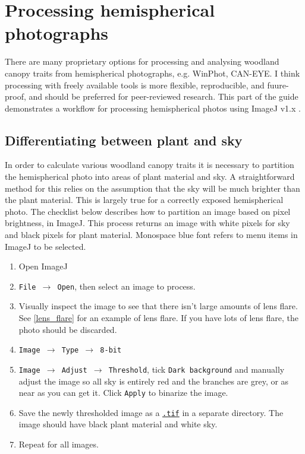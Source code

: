 \documentclass{article}
\newcommand\menu[1]{\texttt{\color{blue}#1}}
\newcommand\file[1]{\texttt{\underline{#1}}}
\begin{document}
\section{Processing hemispherical photographs}

There are many proprietary options for processing and analysing woodland canopy traits from hemispherical photographs, e.g. WinPhot, CAN-EYE. I think processing with freely available tools is more flexible, reproducible, and fuure-proof, and should be preferred for peer-reviewed research. This part of the guide demonstrates a workflow for processing hemispherical photos using ImageJ v1.x \citep{Schneider2012}.

\subsection{Differentiating between plant and sky}

In order to calculate various woodland canopy traits it is necessary to partition the hemispherical photo into areas of plant material and sky. A straightforward method for this relies on the assumption that the sky will be much brighter than the plant material. This is largely true for a correctly exposed hemispherical photo. The checklist below describes how to partition an image based on pixel brightness, in ImageJ. This process returns an image with white pixels for sky and black pixels for plant material. Monospace blue font refers to menu items in ImageJ to be selected.

\begin{enumerate}
	\item{Open ImageJ}
	\item{\menu{File $\rightarrow$ Open}, then select an image to process.}
	\item{Visually inspect the image to see that there isn't large amounts of lens flare. See \autoref{lens_flare} for an example of lens flare. If you have lots of lens flare, the photo should be discarded.}
	\item{\menu{Image $\rightarrow$ Type $\rightarrow$ 8-bit}}
	\item{\menu{Image $\rightarrow$ Adjust $\rightarrow$ Threshold}, tick \menu{Dark background} and manually adjust the image so all sky is entirely red and the branches are grey, or as near as you can get it. Click \menu{Apply} to binarize the image.}
	\item{Save the newly thresholded image as a \file{.tif} in a separate directory. The image should have black plant material and white sky.}
	\item{Repeat for all images.}
\end{enumerate}
\end{document}
